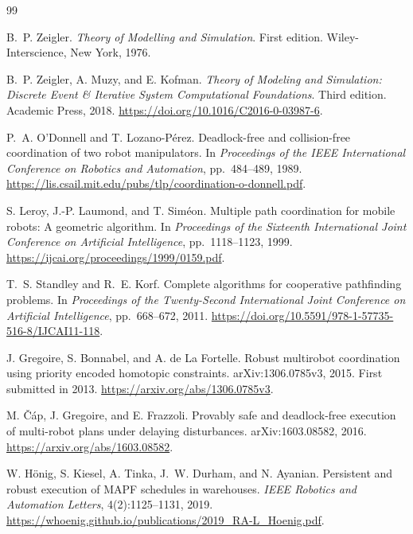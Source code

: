 \documentclass[11pt,a4paper]{article}
\theoremstyle{remark}
\newcounter{algorithm}
\begin{document}
{\latinfont
\begin{thebibliography}{99}

B.~P. Zeigler.
\newblock \emph{Theory of Modelling and Simulation}.
\newblock First edition. Wiley-Interscience, New York, 1976.

B.~P. Zeigler, A. Muzy, and E. Kofman.
\newblock \emph{Theory of Modeling and Simulation: Discrete Event \& Iterative
System Computational Foundations}.
\newblock Third edition. Academic Press, 2018.
\newblock \url{https://doi.org/10.1016/C2016-0-03987-6}.

P.~A. O'Donnell and T. Lozano-P\'erez.
\newblock Deadlock-free and collision-free coordination of two robot manipulators.
\newblock In \emph{Proceedings of the IEEE International Conference on Robotics
and Automation}, pp.~484--489, 1989.
\newblock \url{https://lis.csail.mit.edu/pubs/tlp/coordination-o-donnell.pdf}.

S. Leroy, J.-P. Laumond, and T. Sim\'eon.
\newblock Multiple path coordination for mobile robots: A geometric algorithm.
\newblock In \emph{Proceedings of the Sixteenth International Joint Conference
on Artificial Intelligence}, pp.~1118--1123, 1999.
\newblock \url{https://ijcai.org/proceedings/1999/0159.pdf}.

T.~S. Standley and R.~E. Korf.
\newblock Complete algorithms for cooperative pathfinding problems.
\newblock In \emph{Proceedings of the Twenty-Second International Joint
Conference on Artificial Intelligence}, pp.~668--672, 2011.
\newblock \url{https://doi.org/10.5591/978-1-57735-516-8/IJCAI11-118}.

J. Gregoire, S. Bonnabel, and A. de La Fortelle.
\newblock Robust multirobot coordination using priority encoded homotopic constraints.
\newblock arXiv:1306.0785v3, 2015. First submitted in 2013.
\newblock \url{https://arxiv.org/abs/1306.0785v3}.

M. \v{C}\'ap, J. Gregoire, and E. Frazzoli.
\newblock Provably safe and deadlock-free execution of multi-robot plans under
delaying disturbances.
\newblock arXiv:1603.08582, 2016.
\newblock \url{https://arxiv.org/abs/1603.08582}.

W. H\"onig, S. Kiesel, A. Tinka, J.~W. Durham, and N. Ayanian.
\newblock Persistent and robust execution of MAPF schedules in warehouses.
\newblock \emph{IEEE Robotics and Automation Letters}, 4(2):1125--1131, 2019.
\newblock \url{https://whoenig.github.io/publications/2019_RA-L_Hoenig.pdf}.


\end{thebibliography}}
\end{document}
